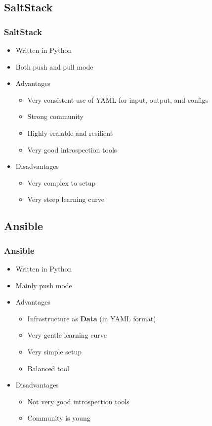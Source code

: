 \documentclass[t,aspectratio=169]{beamer}
\begin{document}
\subsection{SaltStack}
\begin{frame}
    \frametitle{SaltStack}
    \begin{itemize}
        \item<2-> Written in Python
        \item<3-> Both push and pull mode
        \item<4-> Advantages
        \begin{itemize}
            \item<5-> Very consistent use of YAML for input, output, and configs
            \item<6-> Strong community
            \item<7-> Highly scalable and resilient
            \item<8-> Very good introspection tools
        \end{itemize}
        \item<9-> Disadvantages
        \begin{itemize}
            \item<10-> Very complex to setup
            \item<11-> Very steep learning curve
        \end{itemize}
    \end{itemize}
\end{frame}

\subsection{Ansible}
\begin{frame}
    \frametitle{Ansible}
    \begin{itemize}
        \item<2-> Written in Python
        \item<3-> Mainly push mode
        \item<4-> Advantages
        \begin{itemize}
            \item<5-> Infrastructure as \textbf{Data} (in YAML format)
            \item<6-> Very gentle learning curve
            \item<7-> Very simple setup
            \item<8-> Balanced tool
        \end{itemize}
        \item<9-> Disadvantages
        \begin{itemize}
            \item<10-> Not very good introspection tools
            \item<11-> Community is young
        \end{itemize}
    \end{itemize}
\end{frame}
\end{document}
